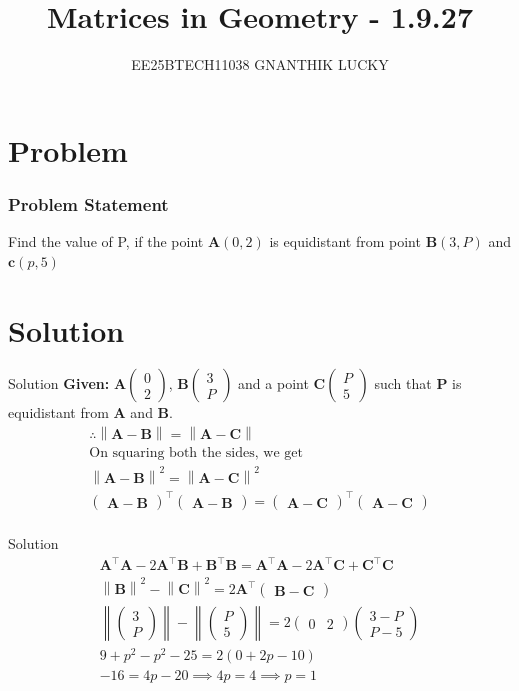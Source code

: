 \documentclass{beamer}
\title{Matrices in Geometry - 1.9.27}
\author{EE25BTECH11038  GNANTHIK LUCKY}
\let\vec\mathbf
\providecommand{\brak}[1]{\ensuremath{\left(#1\right)}}
\theoremstyle{remark}
\providecommand{\norm}[1]{\left\lVert#1\right\rVert}
\newcommand{\myvec}[1]{\ensuremath{\begin{pmatrix}#1\end{pmatrix}}}
\begin{document}
\maketitle


\section{Problem}
\begin{frame}
\frametitle{Problem Statement}
Find the value of P, if the point $\vec{A}\brak{0,2}$ is equidistant from point $\vec{B}\brak{3,P}$ and $\vec{c}\brak{p,5}$
\end{frame}

\section{Solution}
\begin{frame}{Solution}
   \textbf{Given: } 
$\vec{A}\myvec{0\\2}$, $\vec{B}\myvec{3\\P}$ and a point $\vec{C} \myvec{P\\ 5}$ such that $\vec{P}$ is equidistant from $\vec{A}$ and $\vec{B}$. 
\begin{align}
    \therefore \norm{\vec{A}-\vec{B}}=\norm{\vec{A}-\vec{C}}\\
    \text{On squaring both the sides, we get }\\
    \norm{\vec{A}-\vec{B}}^2=\norm{\vec{A}-\vec{C}}^2\\
    \myvec{\vec{A}-\vec{B}}^{\top}\myvec{\vec{A}-\vec{B}}=\myvec{\vec{A}-\vec{C}}^{\top}\myvec{\vec{A}-\vec{C}}\\
\end{align}
\end{frame}

\begin{frame}{Solution}
\begin{align}
\vec{A}^{\top}\vec{A} - 2\vec{A}^{\top}\vec{B} + \vec{B}^{\top}\vec{B} =\vec{A}^{\top}\vec{A} - 2\vec{A}^{\top}\vec{C} + \vec{C}^{\top}\vec{C}\\
    \norm{\vec{B}}^2 - \norm{\vec{C}}^2=2\vec{A}^{\top}\myvec{\vec{B}-\vec{C}}\\
    \norm{\myvec{3\\P}} - \norm{\myvec{P\\5}}=2\myvec{0 & 2}\myvec{3-P \\ P-5}\\
    9 + p^2 - p^2 -25 = 2\brak{0+2p-10}\\
    -16=4p - 20 \implies 4p =4 \implies p=1
\end{align}
\end{frame}
\end{document}
